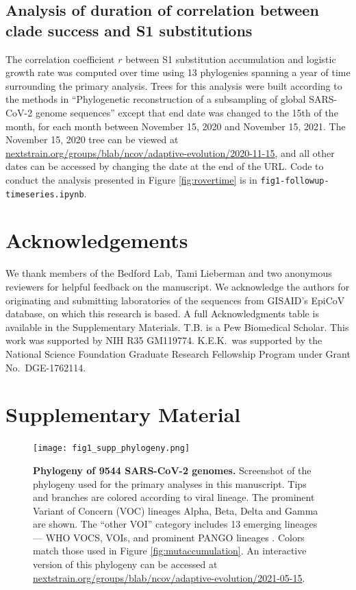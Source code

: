 \documentclass[11pt,oneside,letterpaper]{article}
\newcommand{\beginsupplement}{%
	\setcounter{figure}{0}
	\renewcommand{\thefigure}{S\arabic{figure}}%
}
\begin{document}
\subsection*{Analysis of duration of correlation between clade success and S1 substitutions}
The correlation coefficient $r$ between S1 substitution accumulation and logistic growth rate was computed over time using 13 phylogenies spanning a year of time surrounding the primary analysis.
Trees for this analysis were built according to the methods in ``Phylogenetic reconstruction of a subsampling of global SARS-CoV-2 genome sequences'' except that end date was changed to the 15th of the month, for each month between November 15, 2020 and November 15, 2021. The November 15, 2020 tree can be viewed at \href{https://nextstrain.org/groups/blab/ncov/adaptive-evolution/2020-11-15}{nextstrain.org/groups/blab/ncov/adaptive-evolution/2020-11-15}, and all other dates can be accessed by changing the date at the end of the URL.
Code to conduct the analysis presented in Figure \ref{fig:rovertime} is in \texttt{fig1-followup-timeseries.ipynb}.


\section*{Acknowledgements}
\fussy
We thank members of the Bedford Lab, Tami Lieberman and two anonymous reviewers for helpful feedback on the manuscript.
We acknowledge the authors for originating and submitting laboratories of the sequences from GISAID's EpiCoV database, on which this research is based.
A full Acknowledgments table is available in the Supplementary Materials.
T.B. is a Pew Biomedical Scholar.
This work was supported by NIH R35 GM119774.
K.E.K.\ was supported by the National Science Foundation Graduate Research Fellowship Program under Grant No.\ DGE-1762114.

\small


\normalsize
\clearpage


\section*{Supplementary Material}
\beginsupplement

\begin{figure}[h!]
\centerline{\texttt{[image: fig1\_supp\_phylogeny.png]}}
\caption{\textbf{Phylogeny of 9544 SARS-CoV-2 genomes.}
Screenshot of the phylogeny used for the primary analyses in this manuscript. Tips and branches are colored according to viral lineage. The prominent Variant of Concern (VOC) lineages Alpha, Beta, Delta and Gamma are shown. The ``other VOI'' category includes 13 emerging lineages --- WHO VOCS, VOIs, and prominent PANGO lineages \cite{Rambaut2020-dy}. Colors match those used in Figure \ref{fig:mutaccumulation}. An interactive version of this phylogeny can be accessed at \href{https://nextstrain.org/groups/blab/ncov/adaptive-evolution/2021-05-15}{nextstrain.org/groups/blab/ncov/adaptive-evolution/2021-05-15}.
}
\label{fig:phylogeny}
\end{figure}
\end{document}
